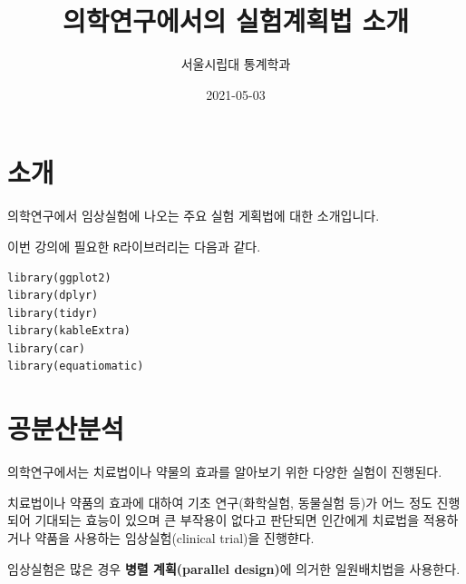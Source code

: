 \documentclass[
]{book}
\title{의학연구에서의 실험계획법 소개}
\author{서울시립대 통계학과}
\date{2021-05-03}
\begin{document}
\maketitle

{
\setcounter{tocdepth}{1}
\tableofcontents
}
\hypertarget{uxc18cuxac1c}{%
\chapter*{소개}\label{uxc18cuxac1c}}


의학연구에서 임상실험에 나오는 주요 실험 게획법에 대한 소개입니다.

이번 강의에 필요한 \texttt{R}라이브러리는 다음과 같다.

\begin{verbatim}
library(ggplot2)
library(dplyr)
library(tidyr)
library(kableExtra)
library(car)
library(equatiomatic)
\end{verbatim}

\mainmatter

\hypertarget{intro}{%
\chapter{공분산분석}\label{intro}}

의학연구에서는 치료법이나 약물의 효과를 알아보기 위한 다양한 실험이 진행된다.

치료법이나 약품의 효과에 대하여 기초 연구(화학실험, 동물실험 등)가 어느 정도 진행되어 기대되는 효능이 있으며 큰 부작용이 없다고 판단되면 인간에게 치료법을 적용하거나 약품을 사용하는 임상실험(clinical trial)을 진행햔다.

임상실험은 많은 경우 \textbf{병렬 계획(parallel design)}에 의거한 일원배치법을 사용한다.
\end{document}
